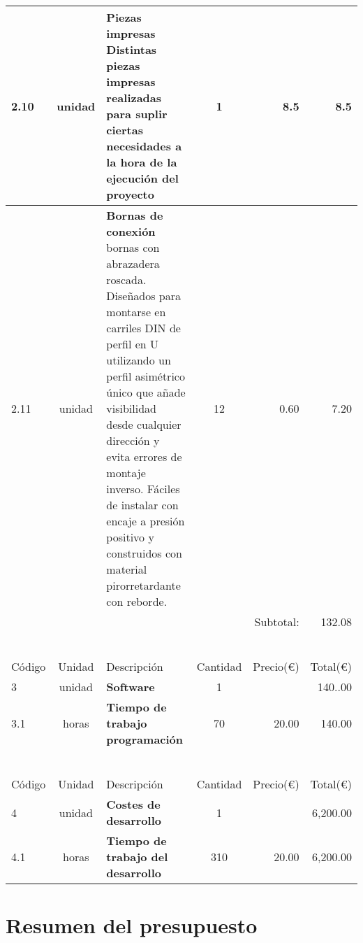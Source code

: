 \begin{longtable}{l c p{7cm} c r r}
    2.10 & unidad & \textbf{Piezas impresas} \newline \small Distintas piezas impresas realizadas para suplir ciertas necesidades a la hora de la ejecución del proyecto & 1 & 8.5 & 8.5\\ \hline
  
    2.11 & unidad & \textbf{Bornas de conexión} \newline \small bornas con abrazadera roscada. Diseñados para montarse en carriles DIN de perfil en U utilizando un perfil asimétrico único que añade visibilidad desde cualquier dirección y evita errores de montaje inverso. Fáciles de instalar con encaje a presión positivo y construidos con material pirorretardante con reborde. & 12 & 0.60 & 7.20  \\ \hline
    
    &&&& Subtotal: &132.08\\

     \\~\\  \hline

    Código & Unidad & Descripción  & Cantidad & Precio(\euro) & Total(\euro)  \\ \hline \hline \hline \hline
    3 & unidad & \textbf{Software} & 1 & \multicolumn{1}{r}{} & 140..00 \\ \hline
    3.1 & horas & \textbf{Tiempo de trabajo programación} & 70 & 20.00 & 140.00 \\ \hline  
    
    \\~\\ \hline
    
    Código & Unidad & Descripción  & Cantidad & Precio(\euro) & Total(\euro)  \\ \hline \hline \hline \hline
    4 & unidad & \textbf{Costes de desarrollo} & 1 & \multicolumn{1}{r}{} & 6,200.00 \\ \hline
    4.1 & horas & \textbf{Tiempo de trabajo del desarrollo} & 310 & 20.00 & 6,200.00 \\ \hline  
   
\end{longtable}

\newpage
\section{Resumen del presupuesto}

